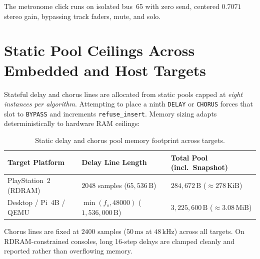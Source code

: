 The metronome click runs on isolated bus~65 with zero send, centered $0.7071$ stereo gain, bypassing track faders, mute, and solo.

\section{Static Pool Ceilings Across Embedded and Host Targets}

Stateful delay and chorus lines are allocated from static pools capped at \emph{eight instances per algorithm}. Attempting to place a ninth \texttt{DELAY} or \texttt{CHORUS} forces that slot to \texttt{BYPASS} and increments \texttt{refuse\_insert}. Memory sizing adapts deterministically to hardware RAM ceilings:

\begin{table}[htbp]
\centering
\caption{Static delay and chorus pool memory footprint across targets.}
\small
\begin{tabular}{@{}lll@{}}
\toprule
Target Platform & Delay Line Length & Total Pool (incl.\ Snapshot) \\
\midrule
PlayStation~2 (RDRAM) & $2048$ samples ($65,536\,\text{B}$) & $284,672\,\text{B}$ ($\approx 278\,\text{KiB}$) \\
Desktop / Pi~4B / QEMU & $\min(f_s, 48000)$ ($1,536,000\,\text{B}$) & $3,225,600\,\text{B}$ ($\approx 3.08\,\text{MiB}$) \\
\bottomrule
\end{tabular}
\end{table}

Chorus lines are fixed at $2400$ samples ($50\,\text{ms}$ at $48\,\text{kHz}$) across all targets. On RDRAM-constrained consoles, long 16-step delays are clamped cleanly and reported rather than overflowing memory.
